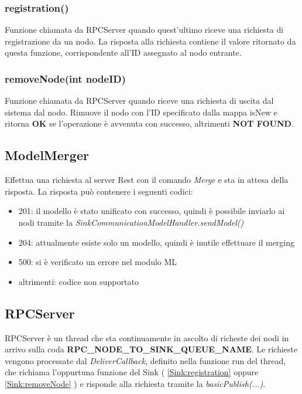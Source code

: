       \subsubsection{registration()}
        Funzione chiamata da RPCServer quando quest'ultimo riceve una richiesta di registrazione da un nodo. La risposta alla richiesta contiene il valore ritornato da questa funzione, corrispondente all'ID assegnato al nodo entrante.
        

      \subsubsection{removeNode(int nodeID)}
        Funzione chiamata da RPCServer quando riceve una richiesta di uscita dal sistema dal nodo. Rimuove il nodo con l'ID specificato dalla mappa isNew e ritorna \textbf{OK} se l'operazione è avvenuta con successo, altrimenti \textbf{NOT FOUND}.
        

    \subsection{ModelMerger}\label{ModelMerger}
      Effettua una richiesta al server Rest con il comando \textit{Merge} e sta in attesa della risposta. La risposta può contenere i seguenti codici:
      \begin{itemize}
        \item 201: il modello è stato unificato con successo, quindi è possibile inviarlo ai nodi tramite la \textit{SinkCommunicationModelHandler.sendModel()}
        \item 204: attualmente esiste solo un modello, quindi è inutile effettuare il merging
        \item 500: si è verificato un errore nel modulo ML
        \item altrimenti: codice non supportato
      \end{itemize}
      

    \subsection{RPCServer}\label{RPCServer}
      RPCServer è un thread che sta continuamente in ascolto di richeste dei nodi in arrivo sulla coda \textbf{RPC\_NODE\_TO\_SINK\_QUEUE\_NAME}. Le richieste vengono processate dal \textit{DeliverCallback}, definito nella funzione run del thread, che richiama l'oppurtuna funzione del Sink ( \ref{Sink:registration} oppure \ref{Sink:removeNode} ) e risponde alla richiesta tramite la \textit{basicPublish(...)}.
      

